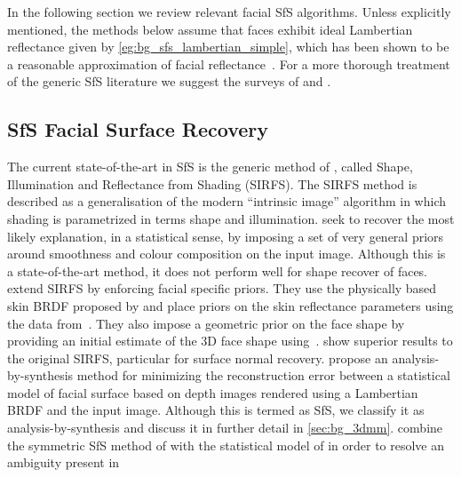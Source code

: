 In the following section we review relevant facial SfS algorithms. Unless
explicitly mentioned, the methods below assume that faces exhibit ideal
Lambertian reflectance given by \cref{eg:bg_sfs_lambertian_simple},
which has been shown to be a reasonable approximation
of facial reflectance~\cite{Sirovich:1987te,georghiades2001fromfew,%
Basri:2003ie,turk1991eigenfaces,Hallinan:1994dz,ramamoorthi2002analytic,%
ramamoorthi2001relationship,shashua1997photometric,moses1993face}. For a more
thorough treatment of the generic SfS literature we suggest the surveys
of \citet{zhang1999shape} and \citet{durou2008numerical}.
\subsection{SfS Facial Surface Recovery}
The current state-of-the-art in SfS is the generic method of
\citet{barron2015shape}, called
Shape, Illumination and Reflectance from Shading (SIRFS). The SIRFS method is
described as a generalisation of the modern ``intrinsic image'' algorithm in
which shading is parametrized in terms shape and illumination.
\citet{barron2015shape} seek to recover the most likely explanation, in a
statistical sense, by imposing a set of very general priors around smoothness
and colour composition on the input image. Although this is a state-of-the-art
method, it does not perform well for shape recover of faces.
\citet{li2014intrinsic} extend SIRFS by enforcing facial specific priors. They
use the physically based skin BRDF proposed by \citet{weyrich2006analysis} and
place priors on the skin reflectance parameters using the data
from~\cite{weyrich2006analysis}. They also impose a geometric prior on the face
shape by providing an initial estimate of the 3D face shape
using~\cite{Yang:2011gj}. \citet{li2014intrinsic} show superior results to the
original SIRFS, particular for surface normal recovery.
\citet{atick1996statistical} propose an analysis-by-synthesis method
for minimizing the reconstruction error between a statistical model of facial
surface based on depth images rendered using a Lambertian BRDF and the input
image. Although this is termed as SfS, we classify it as analysis-by-synthesis
and discuss it in further detail in \cref{sec:bg_3dmm}.
\citet{dovgard2004statistical} combine the symmetric SfS method of
\citet{yilmaz2002estimation} with the statistical model of
\citet{atick1996statistical} in order to resolve an ambiguity present in
